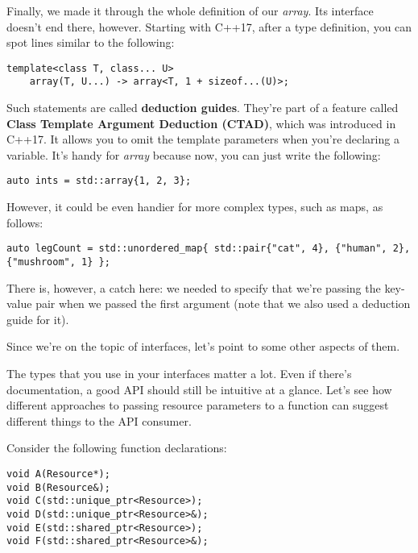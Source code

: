 Finally, we made it through the whole definition of our \textit{array}. Its interface doesn't end there, however. Starting with C++17, after a type definition, you can spot lines similar to the following:

\begin{lstlisting}[style=styleCXX]
template<class T, class... U>
	array(T, U...) -> array<T, 1 + sizeof...(U)>;
\end{lstlisting}

Such statements are called \textbf{deduction guides}. They're part of a feature called \textbf{Class Template Argument Deduction (CTAD)}, which was introduced in C++17. It allows you to omit the template parameters when you're declaring a variable. It's handy for \textit{array} because now, you can just write the following:


\begin{lstlisting}[style=styleCXX]
auto ints = std::array{1, 2, 3};

\end{lstlisting}

However, it could be even handier for more complex types, such as maps, as follows:

\begin{lstlisting}[style=styleCXX]
auto legCount = std::unordered_map{ std::pair{"cat", 4}, {"human", 2}, {"mushroom", 1} };

\end{lstlisting}

There is, however, a catch here: we needed to specify that we're passing the key-value pair when we passed the first argument (note that we also used a deduction guide for it).

Since we're on the topic of interfaces, let's point to some other aspects of them.


The types that you use in your interfaces matter a lot. Even if there's documentation, a good API should still be intuitive at a glance. Let's see how different approaches to passing resource parameters to a function can suggest different things to the API consumer.

Consider the following function declarations:

\begin{lstlisting}[style=styleCXX]
void A(Resource*);
void B(Resource&);
void C(std::unique_ptr<Resource>);
void D(std::unique_ptr<Resource>&);
void E(std::shared_ptr<Resource>);
void F(std::shared_ptr<Resource>&);
\end{lstlisting}

